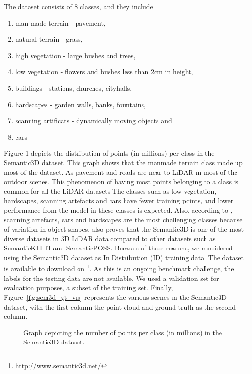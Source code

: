     The dataset consists of 8 classes, and they include
\begin{enumerate}
    \item man-made terrain - pavement,
    \item natural terrain - grass,
    \item high vegetation - large bushes and trees,
    \item low vegetation - flowers and bushes less than 2cm in height,
    \item buildings - stations, churches, cityhalls,
    \item hardscapes - garden walls, banks, fountains,
    \item scanning artificats - dynamically moving objects and
    \item cars
\end{enumerate}
Figure \ref{fig:sem3ddist} depicts the distribution of points (in millions) per class in the Semantic3D dataset.
This graph shows that the manmade terrain class made up most of the dataset.
As pavement and roads are near to LiDAR in most of the outdoor scenes.
This phenomenon of having most points belonging to a class is common for all the LiDAR datasets 
The classes such as low vegetation, hardscapes, scanning artefacts and cars have fewer training points, and lower performance from the model in these classes is expected.
Also, according to \cite{hackel2017semantic3d}, scanning artefacts, cars and hardscapes are the most challenging classes because of variation in object shapes.
\cite{survey3d} also proves that the Semantic3D is one of the most diverse datasets in 3D LiDAR data compared to other datasets such as SemanticKITTI and SemanticPOSS.
Because of these reasons, we considered using the Semantic3D dataset as In Distribution (ID) training data.
The dataset is available to download on \footnote[1]{http://www.semantic3d.net/}. 
As this is an ongoing benchmark challenge, the labels for the testing data are not available.
We used a validation set for evaluation purposes, a subset of the training set.
Finally, Figure~\ref{fig:sem3d_gt_vis} represents the various scenes in the Semantic3D dataset, with the first column the point cloud and ground truth as the second column.
\begin{figure}[h!]
    \centering
    
    \caption{Graph depicting the number of points per class (in millions) in the Semantic3D dataset.}
    \label{fig:sem3ddist}
\end{figure}



